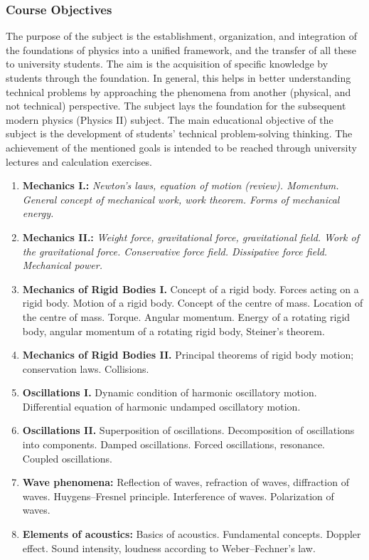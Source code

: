 \documentclass[t,aspectratio=169]{beamer}
\begin{document}
\begin{frame}
\frametitle{Course Objectives}
The purpose of the subject is the establishment, organization, and integration of the foundations of physics into a unified framework, and the transfer of all these to university students. The aim is the acquisition of specific knowledge by students through the foundation. In general, this helps in better understanding technical problems by approaching the phenomena from another (physical, and not technical) perspective. The subject lays the foundation for the subsequent modern physics (Physics II) subject. The main educational objective of the subject is the development of students’ technical problem-solving thinking. The achievement of the mentioned goals is intended to be reached through university lectures and calculation exercises.  
\pagebreak
\normalsize
\begin{enumerate}
\setlength{\parskip}{0pt}
\setlength{\itemsep}{0pt}
\item \textbf{Mechanics I.:} \textit{Newton’s laws, equation of motion (review). Momentum. General concept of mechanical work, work theorem. Forms of mechanical energy.}
\item \textbf{Mechanics II.:} \textit{Weight force, gravitational force, gravitational field. Work of the gravitational force. Conservative force field. Dissipative force field. Mechanical power.}
\item \textbf{Mechanics of Rigid Bodies I.} Concept of a rigid body. Forces acting on a rigid body. Motion of a rigid body. Concept of the centre of mass. Location of the centre of mass. Torque. Angular momentum. Energy of a rotating rigid body, angular momentum of a rotating rigid body, Steiner’s theorem. 
\item \textbf{Mechanics of Rigid Bodies II.} Principal theorems of rigid body motion; conservation laws. Collisions.
\item \textbf{Oscillations I.} Dynamic condition of harmonic oscillatory motion. Differential equation of harmonic undamped oscillatory motion.
\pagebreak
\item \textbf{Oscillations II.} Superposition of oscillations. Decomposition of oscillations into components. Damped oscillations. Forced oscillations, resonance. Coupled oscillations.
\item \textbf{Wave phenomena:} Reflection of waves, refraction of waves, diffraction of waves. Huygens–Fresnel principle. Interference of waves. Polarization of waves.
\item \textbf{Elements of acoustics:} Basics of acoustics. Fundamental concepts. Doppler effect. Sound intensity, loudness according to Weber–Fechner’s law.

\end{enumerate}
\end{frame}
\end{document}
